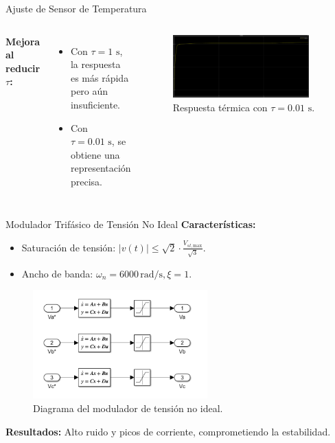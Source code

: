 \documentclass[12pt]{beamer}
\begin{document}
\begin{frame}{Ajuste de Sensor de Temperatura}
    \begin{columns}
        \textbf{Mejora al reducir \(\tau\):}
        \begin{itemize}
            \item Con \(\tau = 1 \text{ s}\), la respuesta es más rápida pero aún insuficiente.
            \item Con \(\tau = 0.01 \text{ s}\), se obtiene una representación precisa.
        \end{itemize}

        \begin{figure}
            \centering
            \includegraphics[width=0.9\textwidth]{Imagenes/13_tempNI_01.png}
            \caption{Respuesta térmica con \(\tau = 0.01 \text{ s}\).}
        \end{figure}
    \end{columns}
\end{frame}



\begin{frame}{Modulador Trifásico de Tensión No Ideal}
\textbf{Características:}
\begin{itemize}
    \item Saturación de tensión: \( \lvert v(t) \rvert \leq \sqrt{2} \cdot \frac{V_{sl,\text{max}}}{\sqrt{3}} \).
    \item Ancho de banda: \( \omega_n = 6000 \, \text{rad/s}, \xi = 1 \).
\end{itemize}

\begin{figure}[h]
    \centering
    \includegraphics[width=0.6\textwidth]{Imagenes/Bloques_Modulador_Tension_No_Ideal.png}
    \caption{Diagrama del modulador de tensión no ideal.}
\end{figure}

\textbf{Resultados:} Alto ruido y picos de corriente, comprometiendo la estabilidad.
\end{frame}
\end{document}
